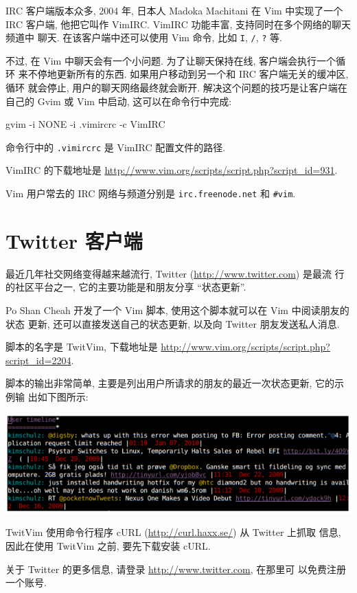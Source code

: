 IRC 客户端版本众多, 2004 年, 日本人 Madoka Machitani 在 Vim 中实现了一个 IRC
客户端, 他把它叫作 VimIRC. VimIRC 功能丰富, 支持同时在多个网络的聊天频道中
聊天. 在该客户端中还可以使用 Vim 命令, 比如 \texttt{I}, \texttt{/},
\texttt{?} 等.

不过, 在 Vim 中聊天会有一个小问题. 为了让聊天保持在线, 客户端会执行一个循环
来不停地更新所有的东西. 如果用户移动到另一个和 IRC 客户端无关的缓冲区, 循环
就会停止, 用户的聊天网络最终就会断开. 解决这个问题的技巧是让客户端在自己的
Gvim 或 Vim 中启动, 这可以在命令行中完成:
\begin{vimcode}
gvim -i NONE -i .vimircrc -c VimIRC
\end{vimcode}
命令行中的 \texttt{.vimircrc} 是 VimIRC 配置文件的路径.

VimIRC 的下载地址是 \url{http://www.vim.org/scripts/script.php?script_id=931}.

\begin{warning}
    Vim 用户常去的 IRC 网络与频道分别是 \texttt{irc.freenode.net} 和
    \texttt{\#vim}.
\end{warning}

\section{Twitter 客户端}
\label{sec:using_vim_as_a_twitter_client}

最近几年社交网络变得越来越流行, Twitter (\url{http://www.twitter.com}) 是最流
行的社区平台之一, 它的主要功能是和朋友分享 ``状态更新''.

Po Shan Cheah 开发了一个 Vim 脚本, 使用这个脚本就可以在 Vim 中阅读朋友的状态
更新, 还可以直接发送自己的状态更新, 以及向 Twitter 朋友发送私人消息.

脚本的名字是 TwitVim, 下载地址是
\url{http://www.vim.org/scripts/script.php?script_id=2204}.

脚本的输出非常简单, 主要是列出用户所请求的朋友的最近一次状态更新, 它的示例输
出如下图所示:
\begin{center}
    \includegraphics[scale=0.6]{./images/page213.png}
\end{center}

TwitVim 使用命令行程序 cURL (\url{http://curl.haxx.se/}) 从 Twitter 上抓取
信息, 因此在使用 TwitVim 之前, 要先下载安装 cURL.

\begin{warning}
    关于 Twitter 的更多信息, 请登录 \url{http://www.twitter.com}, 在那里可
    以免费注册一个账号.
\end{warning}

